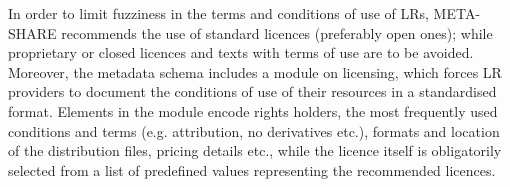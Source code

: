 \documentclass{llncs}
\begin{document}
{In order to limit fuzziness in the terms and conditions of use of LRs, META-SHARE recommends the use of standard licences (preferably open ones); while proprietary or closed licences and texts with terms of use are to be avoided. Moreover, the metadata schema includes a module on licensing, which forces LR providers to document the conditions of use of their resources in a standardised format. Elements in the module encode rights holders, the most frequently used conditions and terms (e.g. attribution, no derivatives etc.), formats and location of the distribution files, pricing details etc., while the licence itself is obligatorily selected from a list of predefined values representing the recommended licences.


}
\end{document}
